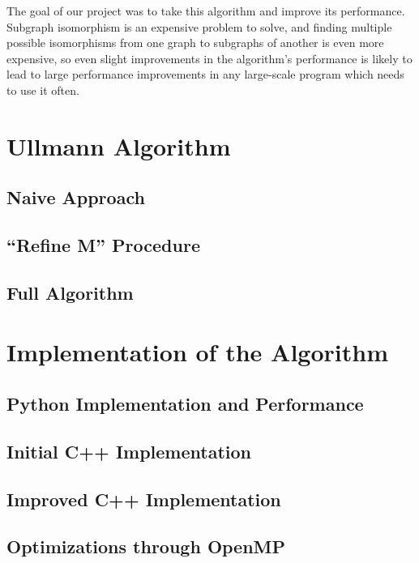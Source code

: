 \documentclass{article}
\begin{document}
The goal of our project was to take this algorithm and improve its performance. Subgraph isomorphism is an expensive problem to solve, and finding multiple possible isomorphisms from one graph to subgraphs of another is even more expensive, so even slight improvements in the algorithm's performance is likely to lead to large performance improvements in any large-scale program which needs to use it often.

\section{Ullmann Algorithm}

  \subsection{Naive Approach}

  \subsection{``Refine M'' Procedure}

  \subsection{Full Algorithm}

\section{Implementation of the Algorithm}
  \subsection{Python Implementation and Performance}

  \subsection{Initial C++ Implementation}

  \subsection{Improved C++ Implementation}

  \subsection{Optimizations through OpenMP}
\end{document}
